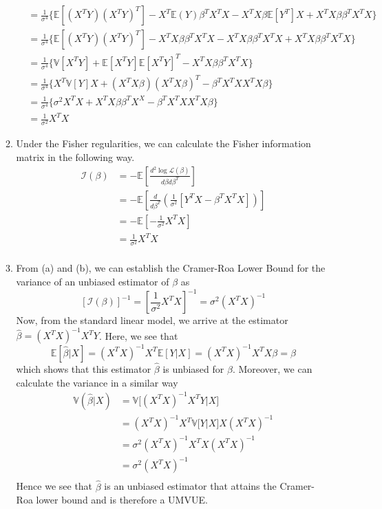 \documentclass[12pt]{article}  %
\newcommand{\E}{{\mathbb{E}}}
\newcommand{\V}{{\mathbb{V}}}
\begin{document}
\begin{enumerate}
\begin{enumerate}
\begin{align*}
&= \frac{1}{\sigma^4}\Big\{\E[(X^TY)(X^TY)^T] -  X^T\E(Y)\beta^TX^TX- X^TX\beta\E[Y^T]X + X^TX\beta\beta^TX^TX\Big\}\\
&= \frac{1}{\sigma^4}\Big\{\E[(X^TY)(X^TY)^T] -  X^TX\beta\beta^TX^TX- X^TX\beta\beta^TX^TX + X^TX\beta\beta^TX^TX\Big\}\\
&= \frac{1}{\sigma^4}\Big\{\V[X^TY] + \E[X^TY]\E[X^TY]^T - X^TX\beta\beta^TX^TX\Big\}\\
&= \frac{1}{\sigma^4}\Big\{X^T\V[Y]X + (X^TX\beta)(X^TX\beta)^T - \beta^TX^TXX^TX\beta\Big\}\\
&= \frac{1}{\sigma^4}\Big\{\sigma^2X^TX + X^TX\beta\beta^TX^X - \beta^TX^TXX^TX\beta\Big\}\\
&= \frac{1}{\sigma^2}X^TX
\end{align*}

\item Under the Fisher regularities, we can calculate the Fisher information matrix in the following way. 
\begin{align*}
\mathcal{I}(\beta) &= -\E\left[\frac{d^2\log\mathcal{L}(\beta)}{d\beta d\beta^T}\right]\\
&= -\E\left[\frac{d}{d\beta^T}\left(\frac{1}{\sigma^2}\left[Y^TX - \beta^TX^TX\right]\right)\right]\\
&= -\E\left[-\frac{1}{\sigma^2}X^{T}X\right]\\
&= \frac{1}{\sigma^2}X^{T}X\\
\end{align*}

\item From (a) and (b), we can establish the Cramer-Roa Lower Bound for the variance of an unbiased estimator of $\beta$ as $$[\mathcal{I}(\beta)]^{-1} = \left[\frac{1}{\sigma^2}X^TX\right]^{-1} = \sigma^2(X^TX)^{-1}$$ Now, from the standard linear model, we arrive at the estimator $\hat{\beta} = (X^TX)^{-1}X^TY$. Here, we see that $$\E[\hat{\beta}|X] = (X^TX)^{-1}X^T\E[Y|X] = (X^TX)^{-1}X^TX\beta = \beta$$ which shows that this estimator $\hat{\beta}$ is unbiased for $\beta$. Moreover, we can calculate the variance in a similar way 
\begin{align*}
\V(\hat{\beta}|X) &= \V\big[(X^TX)^{-1}X^TY|X\big]\\
&= (X^TX)^{-1}X^T\V\big[Y|X\big]X(X^TX)^{-1}\\
&= \sigma^2(X^TX)^{-1}X^TX(X^TX)^{-1}\\
&= \sigma^2(X^TX)^{-1}\\
\end{align*}
Hence we see that $\hat{\beta}$ is an unbiased estimator that attains the Cramer-Roa lower bound and is therefore a UMVUE. 
\end{enumerate}


\end{enumerate}
\end{document}
